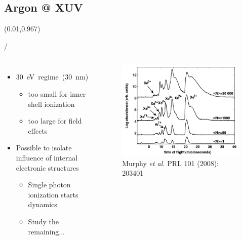 \documentclass{beamer}
\makeatletter
\newcommand{\framenumber}{
\begin{textblock}{0}(0.01,0.967)
\begin{scriptsize}
{\color{gray}\insertframenumber/\inserttotalframenumber}
\end{scriptsize}
\end{textblock}
}
\makeatother
\begin{document}
\subsection{Argon @ XUV}
\begin{frame}{}\framenumber
\begin{columns}
		\begin{itemize}
		\item 30~eV~regime~(30~nm)
			\begin{itemize}
			\item too small for inner shell ionization
			\item too large for field effects
			\end{itemize}
		\item Possible to isolate influence of internal electronic structures
		\begin{itemize}
			\item Single photon ionization starts dynamics
			\item Study the remaining...
		\end{itemize}
		\end{itemize}

		\begin{figure}
			\includegraphics[width=\textwidth]{figures/Murphy2008_fig3}
			\caption{{\tiny Murphy \textit{et al.} PRL 101 (2008): 203401}}
		\end{figure}
\end{columns}
\end{frame}
\end{document}
